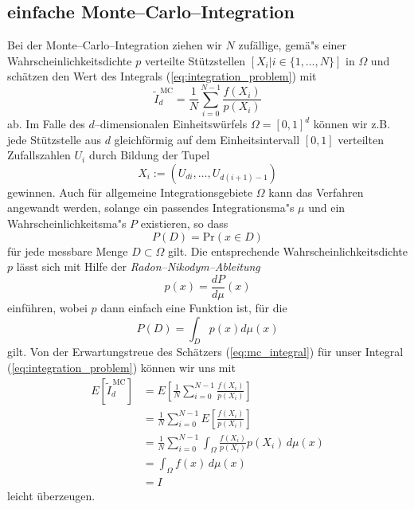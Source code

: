 	\subsection{einfache Monte--Carlo--Integration}
	Bei der Monte--Carlo--Integration ziehen wir $N$ zufällige, gemä"s einer Wahrscheinlichkeitsdichte $p$ verteilte Stützstellen $[X_i|i\in\{1,\dots,N\}]$ in $\Omega$ und schätzen den Wert des Integrals (\ref{eq:integration_problem}) mit
	\begin{equation}
		{\tilde I}_d^{\,\text{MC}}=\frac{1}{N}\sum_{i=0}^{N-1} \frac{f(X_i)}{p(X_i)}
		\label{eq:mc_integral}
	\end{equation}
	ab. Im Falle des $d$--dimensionalen Einheitswürfels $\Omega=[0,1]^d$ können wir z.B. jede Stützstelle aus $d$ gleichförmig auf dem Einheitsintervall $[0,1]$ verteilten Zufallszahlen $U_i$ durch Bildung der Tupel
	$$X_i:=(U_{d i},\dots,U_{d(i+1)-1})$$
	gewinnen. Auch für allgemeine Integrationsgebiete $\Omega$ kann das Verfahren angewandt werden, solange ein passendes Integrationsma"s $\mu$ und ein Wahrscheinlichkeitsma"s $P$ existieren, so dass $$P(D)=\text{Pr}(x\in D)$$ für jede messbare Menge $D\subset\Omega$ gilt. Die entsprechende Wahrscheinlichkeitsdichte $p$ lässt sich mit Hilfe der {\em Radon--Nikodym--Ableitung} $$p(x)=\frac{dP}{d\mu}(x)$$
	einführen, wobei $p$ dann einfach eine Funktion ist, für die $$P(D)=\int_D p(x)d\mu(x)$$ gilt.
	Von der Erwartungstreue des Schätzers (\ref{eq:mc_integral}) für unser Integral (\ref{eq:integration_problem}) können wir uns mit \citep[][2.4]{Veach:1997p9136}
	\begin{align*}
		E[{\tilde I}_d^{\,\text{MC}}] &=E\left[\frac{1}{N}\sum_{i=0}^{N-1}\frac{f(X_i)}{p(X_i)}\right] \\
			&= \frac{1}{N}\sum_{i=0}^{N-1}E\left[\frac{f(X_i)}{p(X_i)}\right] \\
			&= \frac{1}{N}\sum_{i=0}^{N-1}\int_\Omega \frac{f(X_i)}{p(X_i)}p(X_i)\,d\mu(x) \\
			&= \int_\Omega f(x)\,d\mu(x)\\
			&= I
	\end{align*}
	leicht überzeugen.
	
